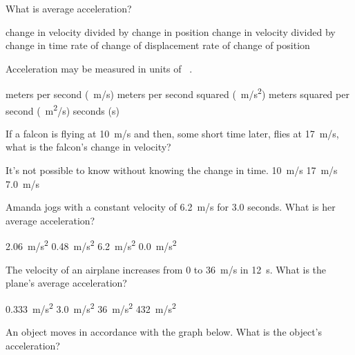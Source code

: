 \documentclass{exam}
\begin{document}
\begin{questions}

\question
What is average acceleration?

\begin{choices}
    \choice change in velocity divided by change in position
    \correctchoice change in velocity divided by change in time
    \choice rate of change of displacement
    \choice rate of change of position
\end{choices}

\question
Acceleration may be measured in units of \fillin\ .

\begin{choices}
    \choice meters per second (\SI{}{m/s})
    \correctchoice meters per second squared (\SI{}{m/s^2})
    \choice meters squared per second (\SI{}{m^2/s})
    \choice seconds (s)
\end{choices}

\question
If a falcon is flying at \SI{10}{m/s} and then, some short time later, flies at \SI{17}{m/s}, what is the falcon's change in velocity?

\begin{choices}
    \choice It's not possible to know without knowing the change in time.
    \choice \SI{10}{m/s}
    \choice \SI{17}{m/s}
    \correctchoice \SI{7.0}{m/s}
\end{choices}

\question
Amanda jogs with a constant velocity of \SI{6.2}{m/s} for 3.0 seconds. What is her average acceleration?

\begin{choices}
    \choice \SI{2.06}{m/s^2}
    \choice \SI{0.48}{m/s^2}
    \choice \SI{6.2}{m/s^2}
    \correctchoice \SI{0.0}{m/s^2}
\end{choices}

\question %
The velocity of an airplane increases from 0 to \SI{36}{m/s} in \SI{12}{s}. What is the plane's average acceleration?

\begin{choices}
\choice \SI{0.333}{m/s^2}
\CorrectChoice \SI{3.0}{m/s^2}
\choice \SI{36}{m/s^2}
\choice \SI{432}{m/s^2}
\end{choices}

\question
An object moves in accordance with the graph below. What is the object's acceleration?
\vspace{1em}


\end{questions}
\end{document}
